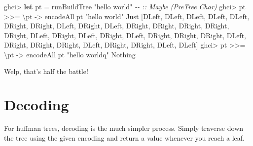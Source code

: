 \documentclass[]{article}
\newenvironment{Shaded}{}{}
\newcommand{\CommentTok}[1]{\textcolor[rgb]{0.38,0.63,0.69}{\textit{#1}}}
\newcommand{\DataTypeTok}[1]{\textcolor[rgb]{0.56,0.13,0.00}{#1}}
\newcommand{\KeywordTok}[1]{\textcolor[rgb]{0.00,0.44,0.13}{\textbf{#1}}}
\newcommand{\NormalTok}[1]{#1}
\newcommand{\OperatorTok}[1]{\textcolor[rgb]{0.40,0.40,0.40}{#1}}
\newcommand{\OtherTok}[1]{\textcolor[rgb]{0.00,0.44,0.13}{#1}}
\newcommand{\StringTok}[1]{\textcolor[rgb]{0.25,0.44,0.63}{#1}}
\begin{document}
\begin{Shaded}
\begin{Highlighting}[]
\NormalTok{ghci}\OperatorTok{\textgreater{}} \KeywordTok{let}\NormalTok{ pt }\OtherTok{=}\NormalTok{ runBuildTree }\StringTok{"hello world"}          \CommentTok{{-}{-} :: Maybe (PreTree Char)}
\NormalTok{ghci}\OperatorTok{\textgreater{}}\NormalTok{ pt }\OperatorTok{\textgreater{}\textgreater{}=}\NormalTok{ \textbackslash{}pt\textquotesingle{} }\OtherTok{{-}\textgreater{}}\NormalTok{ encodeAll pt\textquotesingle{} }\StringTok{"hello world"}
\DataTypeTok{Just}\NormalTok{ [}\DataTypeTok{DLeft}\NormalTok{, }\DataTypeTok{DLeft}\NormalTok{, }\DataTypeTok{DLeft}\NormalTok{, }\DataTypeTok{DLeft}\NormalTok{, }\DataTypeTok{DLeft}\NormalTok{, }\DataTypeTok{DRight}\NormalTok{, }\DataTypeTok{DRight}\NormalTok{, }\DataTypeTok{DLeft}\NormalTok{, }\DataTypeTok{DRight}\NormalTok{, }\DataTypeTok{DLeft}\NormalTok{,}
\DataTypeTok{DRight}\NormalTok{, }\DataTypeTok{DRight}\NormalTok{, }\DataTypeTok{DRight}\NormalTok{, }\DataTypeTok{DRight}\NormalTok{, }\DataTypeTok{DRight}\NormalTok{, }\DataTypeTok{DLeft}\NormalTok{, }\DataTypeTok{DRight}\NormalTok{, }\DataTypeTok{DLeft}\NormalTok{, }\DataTypeTok{DRight}\NormalTok{, }\DataTypeTok{DLeft}\NormalTok{,}
\DataTypeTok{DRight}\NormalTok{, }\DataTypeTok{DRight}\NormalTok{, }\DataTypeTok{DRight}\NormalTok{, }\DataTypeTok{DLeft}\NormalTok{, }\DataTypeTok{DRight}\NormalTok{, }\DataTypeTok{DRight}\NormalTok{, }\DataTypeTok{DRight}\NormalTok{, }\DataTypeTok{DLeft}\NormalTok{, }\DataTypeTok{DRight}\NormalTok{, }\DataTypeTok{DRight}\NormalTok{,}
\DataTypeTok{DLeft}\NormalTok{, }\DataTypeTok{DLeft}\NormalTok{]}
\NormalTok{ghci}\OperatorTok{\textgreater{}}\NormalTok{ pt }\OperatorTok{\textgreater{}\textgreater{}=}\NormalTok{ \textbackslash{}pt\textquotesingle{} }\OtherTok{{-}\textgreater{}}\NormalTok{ encodeAll pt\textquotesingle{} }\StringTok{"hello worldq"}
\DataTypeTok{Nothing}
\end{Highlighting}
\end{Shaded}

Welp, that's half the battle!

\section{Decoding}\label{decoding}

For huffman trees, decoding is the much simpler process. Simply traverse down
the tree using the given encoding and return a value whenever you reach a leaf.
\end{document}
